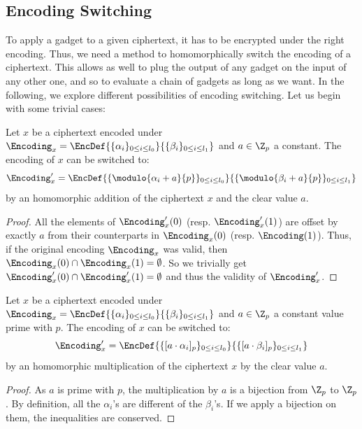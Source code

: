 \subsection{Encoding Switching}
\label{encoding_switching}

To apply a gadget to a given ciphertext, it has to be encrypted under the right encoding. Thus, we need a method to homomorphically switch the encoding of a ciphertext. This allows as well to plug the output of any gadget on the input of any other one, and so to evaluate a chain of gadgets as long as we want. In the following, we explore different possibilities of encoding switching. Let us begin with some trivial cases:

\begin{property}
    \label{prop:sum_constant}
    Let $x$ be a ciphertext encoded under $\Encoding_x = \EncDef{\{\alpha_i\}_{0 \le i \le l_0}}{\{\beta_i\}_{0 \le i \le l_1}} $ and $a \in \Z_p$ a constant. The encoding of $x$ can be switched to:
    \[\Encoding_x' = \EncDef{\{\modulo{\alpha_i + a}{p}\}_{0 \le i \le l_0}}{\{\modulo{\beta_i + a}{p}\}_{0 \le i \le l_1}}\] by an homomorphic addition of the ciphertext $x$ and the clear value $a$. 
\end{property}

\begin{proof}
    All the elements of $\Encoding_x'(0)$ (resp. $\Encoding_x'(1)$) are offset by exactly $a$ from their counterparts in $\Encoding_x(0)$ (resp. $\Encoding(1)$). Thus, if the original encoding $\Encoding_x$ was valid, then $\Encoding_x(0) \cap \Encoding_x(1) = \emptyset$. So we trivially get  $\Encoding_x'(0) \cap \Encoding_x'(1) = \emptyset$ and thus the validity of $\Encoding_x'$.
\end{proof}


\begin{property}
    \label{prop:mult_constant}
    Let $x$ be a ciphertext encoded under $\Encoding_x = \EncDef{\{\alpha_i\}_{0 \le i \le l_0}}{\{\beta_i\}_{0 \le i \le l_1}} $ and $a \in \Z_p$ a constant value prime with $p$. The encoding of $x$ can be switched to:
    \[\Encoding'_x = \EncDef{\{[a \cdot \alpha_i]_p\}_{0 \le i \le l_0}}{\{[a \cdot \beta_i]_p\}_{0 \le i \le l_1}}\]
    by an homomorphic multiplication of the ciphertext $x$ by the clear value $a$.
\end{property}
\begin{proof}
As $a$ is prime with $p$, the multiplication by $a$ is a bijection from $\Z_p$ to $\Z_p$. By definition, all the $\alpha_i$'s are different of the $\beta_i$'s. If we apply a bijection on them, the inequalities are conserved.
\end{proof}

